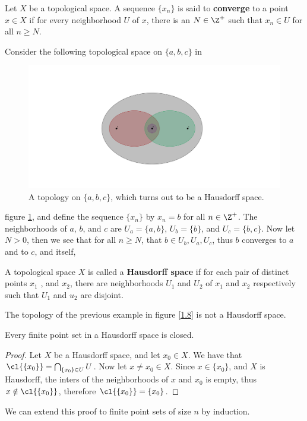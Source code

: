 \begin{definition}
    Let $X$ be a topological space. A sequence  $\{x_n\}$ is said to
    \textbf{converge} to a point  $x \in X$ if for every neighborhood  $U$ of
    $x$, there is an  $N \in \Z^+$ such that  $x_n \in U$ for all  $n \geq N$.		
\end{definition}

\begin{example}
    Consider the following topological space on $\{a,b,c\}$ in 
    \begin{figure}[h]
        \centering
        \includegraphics[scale = 0.5]{Figures/Chapter1/hausdorffSpace.png}
        \caption{A topology on $\{a,b,c\}$, which turns out to be a Hausdorff
        space.}
        \label{fig1.8}
    \end{figure}
    figure \ref{fig1.8}, and define the sequence $\{x_n\}$ by  $x_n=b$ for all
    $n \in \Z^+$. The neighborhoods of  $a$, $b$, and $c$ are
    $U_a=\{a,b\}$,  $U_b=\{b\}$, and  $U_c=\{b,c\}$. Now let $N>0$, then we see
    that for all  $n \geq N$, that  $b \in U_b,U_a,U_c$, thus  $b$
    converges to  $a$ and to  $c$, and itself,
\end{example} 

\begin{definition}
    A topological space $X$ is called a \textbf{Hausdorff space} if for each
    pair of distinct points  $ x_1$ , and $x_2$, there are neighborhoods $ U_1$
    and $U_2$ of $ x_1$ and $ x_2$ respectively such that $ U_1$ and $ u_2$ are
    disjoint.
\end{definition}

\begin{example}
    The topology of the previous example in figure \ref{1.8} is not a Hausdorff
    space.
\end{example} 

\begin{theorem}\label{1.6.8}
    Every finite point set in a Hausdorff space is closed.
\end{theorem}
\begin{proof}
    Let $X$ be a Hausdorff space, and let  $x_0 \in X$. We have that
    $\cl{\{x_0\}}=\bigcap_{\{x_0\} \in U}{U}$. Now let $x \neq x_0 \in X$.
    Since $x \in \{x_0\}$, and $X$ is Hausdorff, the inters of the neighborhoods
    of $x$ and  $ x_0$ is empty, thus $x \notin \cl{\{x_0\}}$, therefore
    $\cl{\{x_0\}}=\{x_0\}$.
\end{proof}
\begin{remark}
    We can extend this proof to finite point sets of size $n$ by induction.
\end{remark}

